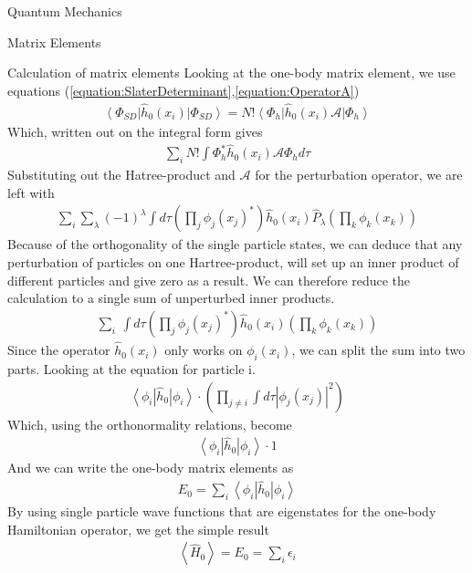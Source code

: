 \documentclass[twoside,english]{uiofysmaster}
\begin{document}
\begin{chapter}{Quantum Mechanics}
\begin{section}{Matrix Elements}
		\begin{subsection}{Calculation of matrix elements}
			Looking at the one-body matrix element, we use equations (\ref{equation:SlaterDeterminant},\ref{equation:OperatorA})
			\begin{align}
				\left< \Phi_{SD} \right| \hat h_0(x_i) \left| \Phi_{SD} \right> = N! \left< \Phi_h \right| \hat h_0(x_i) \mathcal{A} \left| \Phi_h \right> 
			\end{align}
			Which, written out on the integral form gives
			\begin{align}
				\sum_i N! \int \Phi_h^* \hat h_0(x_i) \mathcal{A} \Phi_h d\tau 
			\end{align}
			Substituting out the Hatree-product and $\mathcal{A}$ for the perturbation operator, we are left with
			\begin{align}
				\sum_i \sum_\lambda (-1)^\lambda \int d\tau \left( \prod_j \phi_j(x_j)^* \right) \hat h_0(x_i) \hat P_\lambda \left( \prod_k \phi_k(x_k) \right)
			\end{align}
			Because of the orthogonality of the single particle states, we can deduce that any perturbation of particles on one Hartree-product, will set up an inner product of different particles and give zero as a result. We can therefore reduce the calculation to a single sum of unperturbed inner products. 
			\begin{align}
				\sum_i \ \int d\tau \left( \prod_j \phi_j(x_j)^* \right) \hat h_0(x_i) \left( \prod_k \phi_k(x_k) \right) 
			\end{align}
			Since the operator $\hat h_0(x_i)$ only works on $\phi_i(x_i)$, we can split the sum into two parts. Looking at the equation for particle i.
			\begin{align}
				\left< \phi_i \right| \hat h_0 \left| \phi_i \right> \cdot  \left( \prod_{j \neq i} \int d\tau \left| \phi_j(x_j) \right|^2 \right)
			\end{align}
			Which, using the orthonormality relations, become
			\begin{align}
				\left< \phi_i \right| \hat h_0 \left| \phi_i \right> \cdot 1
			\end{align}
			And we can write the one-body matrix elements as
			\begin{align}
				E_0 = \sum_i \left< \phi_i \right| \hat h_0 \left| \phi_i \right>
			\end{align}
			By using single particle wave functions that are eigenstates for the one-body Hamiltonian operator, we get the simple result
			\begin{align}
				\left< \right. \hat H_0 \left. \right> = E_0 = \sum_i \epsilon_i 
			\end{align}


\end{subsection}
\end{section}
\end{chapter}
\end{document}
